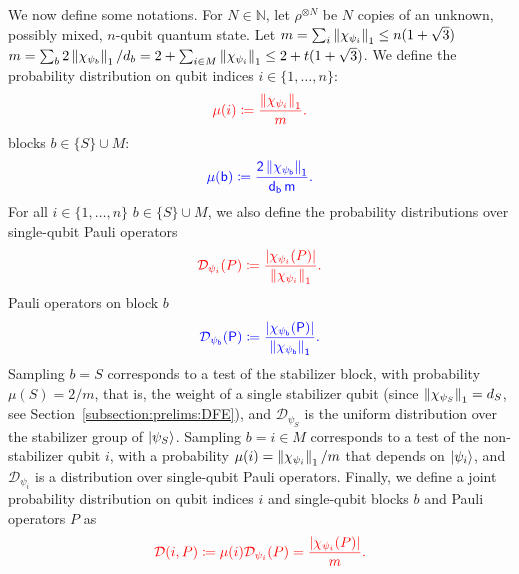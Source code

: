 \documentclass[a4paper,twocolumn,11pt,unpublished]{../../revision/quantumarticle}
\newcommand{\np}{m}
\newcommand{\pdist}{\mathcal D} %
\newcommand{\qubit}{i}
\providecommand{\DIFadd}[1]{{\protect\color{blue} \sf #1}} %
\providecommand{\DIFdel}[1]{{\protect\color{red} \scriptsize #1}} %
\providecommand{\DIFaddbegin}{} %
\providecommand{\DIFaddend}{} %
\providecommand{\DIFdelbegin}{} %
\providecommand{\DIFdelend}{} %
\begin{document}
            \DIFadd{We now define some notations.
            }\DIFaddend For
            $N\in\mathbb
            N$, let $\rho^{\otimes N}$ be $N$ copies of an unknown, possibly mixed, $n$-qubit quantum state.
            Let \DIFdelbegin \DIFdel{$\np=\sum_\qubit \norm{\chi_{\psi_\qubit}}_1\le n(1+\sqrt3)$}\DIFdelend \DIFaddbegin \DIFadd{$\np=\sum_b 2\norm{\chi_{\psi_b}}_1/d_b=2+\sum_{i\in M}\norm{\chi_{\psi_i}}_1\le 2+t(1+\sqrt3)$}\DIFaddend . We define the probability distribution on \DIFdelbegin \DIFdel{qubit indices $i\in\{1,\dots,n\}$:
            }\begin{displaymath}
            \DIFdel{\label{mu_i}
                \mu(\qubit) \coloneqq \frac{\norm{\chi_{\psi_\qubit}}_1}{\np}.
            }\end{displaymath}%
\DIFdelend \DIFaddbegin \DIFadd{blocks $b\in\{S\}\cup M$:
            }\begin{equation}
            \DIFadd{\label{mu_i}
                \mu(b) \coloneqq \frac{2\norm{\chi_{\psi_b}}_1}{d_b\,\np}.
            }\end{equation}\DIFaddend 
            For all \DIFdelbegin \DIFdel{$i\in\{1,\dots,n\}$}\DIFdelend \DIFaddbegin \DIFadd{$b\in\{S\}\cup M$}\DIFaddend , we also define the probability distributions over \DIFdelbegin \DIFdel{single-qubit Pauli operators }\begin{displaymath}
            \DIFdel{\label{Dpsi_iP}
                \mathcal{D}_{\psi_i}(P) \coloneqq \frac{|\chi_{\psi_i}(P)|}{\norm{\chi_{\psi_i}}_1}.
            }\end{displaymath}%
\DIFdelend \DIFaddbegin \DIFadd{Pauli operators on block $b$
            }\begin{equation}
            \DIFadd{\label{Dpsi_iP}
                \mathcal{D}_{\psi_b}(P) \coloneqq \frac{|\chi_{\psi_b}(P)|}{\norm{\chi_{\psi_b}}_1}.
            }\end{equation}\DIFaddend 
            \DIFaddbegin \DIFadd{Sampling $b=S$ corresponds to a test of the stabilizer block, with probability $\mu(S)=2/\np$, that is, the weight of a single stabilizer qubit (since $\left\lVert\chi_{\psi_S}\right\rVert_1=d_S$, see Section~\ref{subsection:prelims:DFE}), and $\mathcal{D}_{\psi_S}$ is the uniform distribution over the stabilizer group of $\ket{\psi_S}$. Sampling $b=i\in M$ corresponds to a test of the non-stabilizer qubit $i$, with a probability $\mu(i)=\norm{\chi_{\psi_i}}_1/\np$ that depends on $\ket{\psi_i}$, and $\mathcal{D}_{\psi_i}$ is a distribution over single-qubit Pauli operators.
             }\DIFaddend Finally, we define a joint probability distribution on \DIFdelbegin \DIFdel{qubit indices $i$ and single-qubit }\DIFdelend \DIFaddbegin \DIFadd{blocks $b$ and }\DIFaddend Pauli operators $P$ \DIFdelbegin \DIFdel{as
             }\begin{displaymath}
            \DIFdel{%
                \pdist(\qubit, P) \coloneqq \mu(\qubit)\pdist_{\psi_\qubit}(P)=\frac{|\chi_{\psi_i}(P)|}{\np}.
            }\end{displaymath}%
\end{document}
